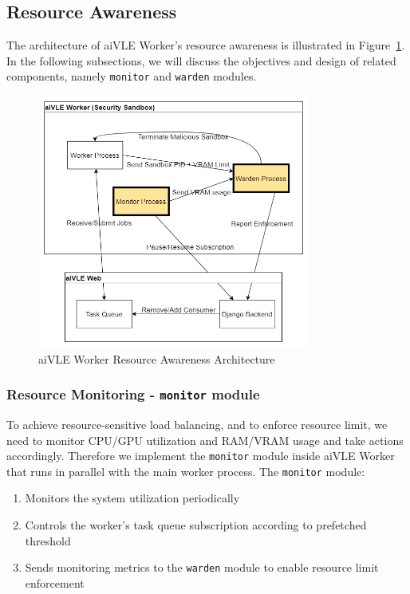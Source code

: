 \subsection{Resource Awareness}
\label{ss:aivle-worker-resource-awareness}
The architecture of aiVLE Worker's resource awareness is illustrated in Figure~\ref{fig:aivle-worker-resource-awareness-arch}. In the following subsections, we will discuss the objectives and design of related components, namely \texttt{monitor} and \texttt{warden} modules.

\begin{figure}[H]
    \centering
    \includegraphics[width=0.8\textwidth]{images/aivle-worker-resource-awareness-arch.png}
    \caption{aiVLE Worker Resource Awareness Architecture}
    \label{fig:aivle-worker-resource-awareness-arch}
\end{figure}

\subsubsection{Resource Monitoring - \texttt{monitor} module}
\label{sss:monitor}
To achieve resource-sensitive load balancing, and to enforce resource limit, we need to monitor CPU/GPU utilization and RAM/VRAM usage and take actions accordingly. Therefore we implement the \texttt{monitor} module inside aiVLE Worker that runs in parallel with the main worker process. The \texttt{monitor} module:
\begin{enumerate}
    \item Monitors the system utilization periodically
    \item Controls the worker's task queue subscription according to prefetched threshold
    \item Sends monitoring metrics to the \texttt{warden} module to enable resource limit enforcement
\end{enumerate}

